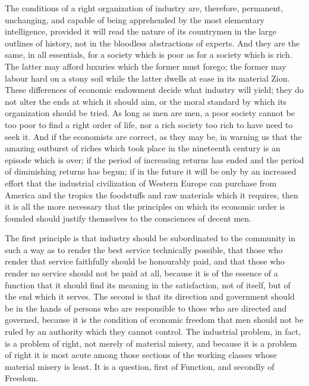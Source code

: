 \documentclass{book}
\begin{document}
The conditions of a right organization of industry are, therefore, permanent, unchanging, and capable of being apprehended by the most elementary intelligence, provided it will read the nature of its countrymen in the large outlines of history, not in the bloodless abstractions of experts. And they are the same, in all essentials, for a society which is poor as for a society which is rich. The latter may afford luxuries which the former must forego; the former may labour hard on a stony soil while the latter dwells at ease in its material Zion. These differences of economic endowment decide what industry will yield; they do not alter the ends at which it should aim, or the moral standard by which its organization should be tried. As long as men are men, a poor society cannot be too poor to find a right order of life, nor a rich society too rich to have need to seek it. And if the economists are correct, as they may be, in warning us that the amazing outburst of riches which took place in the nineteenth century is an episode which is over; if the period of increasing returns has ended and the period of diminishing returns has begun; if in the future it will be only by an increased effort that the industrial civilization of Western Europe can purchase from America and the tropics the foodstuffs and raw materials which it requires, then it is all the more necessary that the principles on which its economic order is founded should justify themselves to the consciences of decent men.

The first principle is that industry should be subordinated to the community in such a way as to render the best service technically possible, that those who render that service faithfully should be honourably paid, and that those who render no service should not be paid at all, because it is of the essence of a function that it should find its meaning in the satisfaction, not of itself, but of the end which it serves. The second is that its direction and government should be in the hands of persons who are responsible to those who are directed and governed, because it is the condition of economic freedom that men should not be ruled by an authority which they cannot control. The industrial problem, in fact, is a problem of right, not merely of material misery, and because it is a problem of right it is most acute among those sections of the working classes whose material misery is least. It is a question, first of Function, and secondly of Freedom.
\end{document}
